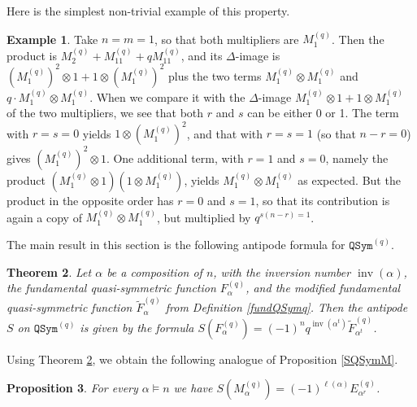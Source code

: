 \documentclass{article}
\newtheorem{thm}{Theorem}[section]
\newtheorem{prop}[thm]{Proposition}
\theoremstyle{definition}
\newtheorem{ex}[thm]{Example}
\begin{document}
Here is the simplest non-trivial example of this property.
\begin{ex}
Take $n=m=1$, so that both multipliers are $M_{1}^{(q)}$. Then the product is $M_{2}^{(q)}+M_{11}^{(q)}+qM_{11}^{(q)}$, and its $\Delta$-image is $(M_{1}^{(q)})^{2}\otimes1+1\otimes(M_{1}^{(q)})^{2}$ plus the two terms $M_{1}^{(q)} \otimes M_{1}^{(q)}$ and $q \cdot M_{1}^{(q)} \otimes M_{1}^{(q)}$. When we compare it with the $\Delta$-image $M_{1}^{(q)}\otimes1+1 \otimes M_{1}^{(q)}$ of the two multipliers, we see that both $r$ and $s$ can be either 0 or 1. The term with $r=s=0$ yields $1\otimes(M_{1}^{(q)})^{2}$, and that with $r=s=1$ (so that $n-r=0$) gives $(M_{1}^{(q)})^{2}\otimes1$. One additional term, with $r=1$ and $s=0$, namely the product $(M_{1}^{(q)}\otimes1)(1 \otimes M_{1}^{(q)})$, yields $M_{1}^{(q)} \otimes M_{1}^{(q)}$ as expected. But the product in the opposite order has $r=0$ and $s=1$, so that its contribution is again a copy of $M_{1}^{(q)} \otimes M_{1}^{(q)}$, but multiplied by $q^{s(n-r)=1}$. \label{qex}
\end{ex}

\medskip

The main result in this section is the following antipode formula for $\mathtt{QSym}^{(q)}$.
\begin{thm}
Let $\alpha$ be a composition of $n$, with the inversion number $\operatorname{inv}(\alpha)$, the fundamental quasi-symmetric function $F_{\alpha}^{(q)}$, and the modified fundamental quasi-symmetric function $\widetilde{F}_{\alpha}^{(q)}$ from Definition \ref{fundQSymq}. Then the antipode $S$ on $\mathtt{QSym}^{(q)}$ is given by the formula $S(F_{\alpha}^{(q)})=(-1)^{n}q^{\operatorname{inv}(\alpha^{t})}\widetilde{F}_{\alpha^{t}}^{(q)}$. \label{SQSymqF}
\end{thm}
Using Theorem \ref{SQSymqF}, we obtain the following analogue of Proposition \ref{SQSymM}.
\begin{prop}
For every $\alpha \vDash n$ we have $S(M_{\alpha}^{(q)})=(-1)^{\ell(\alpha)}E_{\alpha^{r}}^{(q)}$. \label{SQSymqM}
\end{prop}
\end{document}
